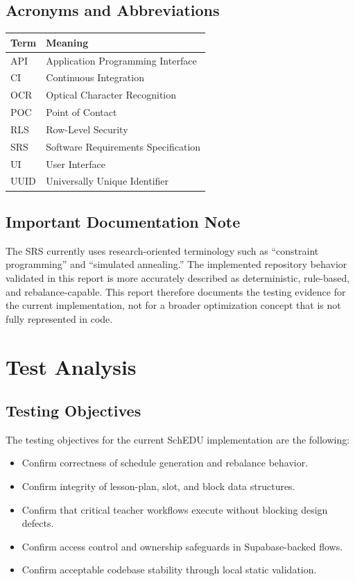 \documentclass[12pt]{article}
\begin{document}
\subsection{Acronyms and Abbreviations}

\begin{longtable}{|L{4cm}|L{10cm}|}
\hline
\textbf{Term} & \textbf{Meaning} \\
\hline
API & Application Programming Interface \\
\hline
CI & Continuous Integration \\
\hline
OCR & Optical Character Recognition \\
\hline
POC & Point of Contact \\
\hline
RLS & Row-Level Security \\
\hline
SRS & Software Requirements Specification \\
\hline
UI & User Interface \\
\hline
UUID & Universally Unique Identifier \\
\hline
\end{longtable}

\subsection{Important Documentation Note}

The SRS currently uses research-oriented terminology such as ``constraint programming'' and ``simulated annealing.'' The implemented repository behavior validated in this report is more accurately described as deterministic, rule-based, and rebalance-capable. This report therefore documents the testing evidence for the current implementation, not for a broader optimization concept that is not fully represented in code.

\newpage

\section{Test Analysis}

\subsection{Testing Objectives}

The testing objectives for the current SchEDU implementation are the following:
\begin{itemize}
    \item Confirm correctness of schedule generation and rebalance behavior.
    \item Confirm integrity of lesson-plan, slot, and block data structures.
    \item Confirm that critical teacher workflows execute without blocking design defects.
    \item Confirm access control and ownership safeguards in Supabase-backed flows.
    \item Confirm acceptable codebase stability through local static validation.
\end{itemize}
\end{document}
